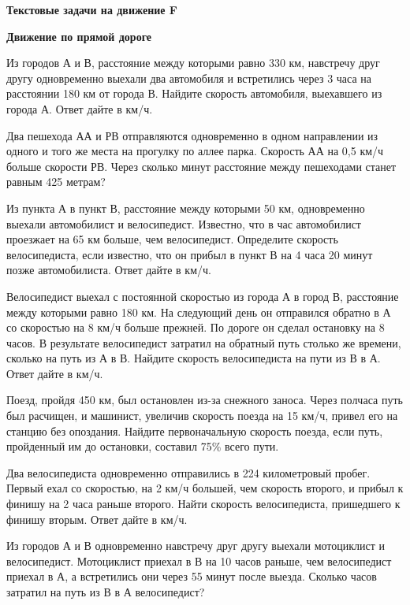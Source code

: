 \centerline{\bf \Huge Текстовые задачи на движение F}

\centerline{\bf \Huge Движение по прямой дороге}

 Из городов А и В, расстояние между которыми равно 330 км, навстречу друг другу одновременно выехали два автомобиля и встретились через 3 часа на расстоянии 180 км от города В. Найдите скорость автомобиля, выехавшего из города А. Ответ дайте в км/ч.

 Два пешехода АА и РВ отправляются одновременно в одном направлении из одного и того же места на прогулку по аллее парка. Скорость АА на 0,5 км/ч больше скорости РВ. Через сколько минут расстояние между пешеходами станет равным 425 метрам?

 Из пункта А в пункт В, расстояние между которыми 50 км, одновременно выехали автомобилист и велосипедист. Известно, что в час автомобилист проезжает на 65 км больше, чем велосипедист. Определите скорость велосипедиста, если известно, что он прибыл в пункт В на 4 часа 20 минут позже автомобилиста. Ответ дайте в км/ч.

 Велосипедист выехал с постоянной скоростью из города А в город В, расстояние между которыми равно 180 км. На следующий день он отправился обратно в А со скоростью на 8 км/ч больше прежней. По дороге он сделал остановку на 8 часов. В результате велосипедист затратил на обратный путь столько же времени, сколько на путь из А в В. Найдите скорость велосипедиста на пути из В в А. Ответ дайте в км/ч.

 Поезд, пройдя 450 км, был остановлен из-за снежного заноса. Через полчаса путь был расчищен, и машинист, увеличив скорость поезда на 15 км/ч, привел его на станцию без опоздания. Найдите первоначальную скорость поезда, если путь, пройденный им до остановки, составил 75\% всего пути.

 Два велосипедиста одновременно отправились в 224 километровый пробег. Первый ехал со скоростью, на 2 км/ч большей, чем скорость второго, и прибыл к финишу на 2 часа раньше второго. Найти скорость велосипедиста, пришедшего к финишу вторым. Ответ дайте в км/ч.

 Из городов А и В одновременно навстречу друг другу выехали мотоциклист и велосипедист. Мотоциклист приехал в В на 10 часов раньше, чем велосипедист приехал в А, а встретились они через 55 минут после выезда. Сколько часов затратил на путь из В в А велосипедист?

